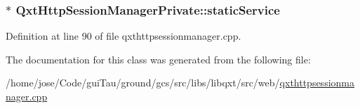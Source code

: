 \hypertarget{class_qxt_http_session_manager_private_a53d1396f3681011b1345b459ea6ffd61}{
\subsubsection[{static\-Service}]{$\ast$ Qxt\-Http\-Session\-Manager\-Private\-::static\-Service}}\label{class_qxt_http_session_manager_private_a53d1396f3681011b1345b459ea6ffd61}


Definition at line 90 of file qxthttpsessionmanager.\-cpp.



The documentation for this class was generated from the following file\-:\begin{DoxyCompactItemize}
\item 
/home/jose/\-Code/gui\-Tau/ground/gcs/src/libs/libqxt/src/web/\hyperlink{qxthttpsessionmanager_8cpp}{qxthttpsessionmanager.\-cpp}\end{DoxyCompactItemize}

